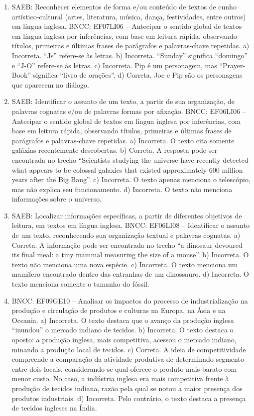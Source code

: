 \begin{enumerate}
\item
SAEB: Reconhecer elementos de forma e/ou conteúdo de textos de cunho
artístico-cultural (artes, literatura, música, dança, festividades,
entre outros) em língua inglesa. BNCC: EF07LI06 -- Antecipar o sentido
global de textos em língua inglesa por inferências, com base em leitura
rápida, observando títulos, primeiras e últimas frases de parágrafos e
palavras-chave repetidas.
a) Incorreta. ``Js'' refere-se às letras. b) Incorreta. ``Sunday''
significa ``domingo'' e ``J-O'' refere-se às letras. c) Incorreta. Pip é
um personagem, mas ``Prayer-Book'' significa ``livro de orações''. d)
Correta. Joe e Pip são os personagens que aparecem no diálogo.

\item
SAEB: Identificar o assunto de um texto, a partir de sua organização, de
palavras cognatas e/ou de palavras formas por afixação. BNCC: EF06LI06
-- Antecipar o sentido global de textos em língua inglesa por
inferências, com base em leitura rápida, observando títulos, primeiras e
últimas frases de parágrafos e palavras-chave repetidas.
a) Incorreta. O texto cita somente galáxias recentemente descobertas. b)
Correta. A resposta pode ser encontrada no trecho ``Scientists studying
the universe have recently detected what appears to be colossal galaxies
that existed approximately 600 million years after the Big Bang''. c)
Incorreta. O texto apenas menciona o telescópio, mas não explica seu
funcionamento. d) Incorreta. O texto não menciona informações sobre o
universo.

\item
SAEB: Localizar informações específicas, a partir de diferentes
objetivos de leitura, em textos em língua inglesa. BNCC: EF06LI08 --
Identificar o assunto de um texto, reconhecendo sua organização textual
e palavras cognatas.
a) Correta. A informação pode ser encontrada no trecho ``a dinosaur
devoured its final meal: a tiny mammal measuring the size of a mouse''.
b) Incorreta. O texto não menciona uma nova espécie. c) Incorreta. O
texto menciona um mamífero encontrado dentro das entranhas de um
dinossauro. d) Incorreta. O texto menciona somente o tamanho do fóssil.

\item
BNCC: EF09GE10 -- Analisar os impactos do processo de industrialização na
produção e circulação de produtos e culturas na Europa, na Ásia e na
Oceania.
a) Incorreta. O texto destaca que o avanço da produção inglesa
``inundou'' o mercado indiano de tecidos.
b) Incorreta. O texto destaca o oposto: a produção inglesa, mais
competitiva, acessou o mercado indiano, minando a produção local de
tecidos.
c) Correta. A ideia de competitividade compreende a
comparação da atividade produtiva de determinado segmento entre dois
locais, considerando-se qual oferece o produto mais barato com menor custo. No caso, a
indústria inglesa era mais competitiva frente à produção de tecidos
indiana, razão pela qual se notou a maior presença dos produtos
industriais.
d) Incorreta. Pelo contrário, o texto destaca a presença de tecidos
ingleses na Índia.


\end{enumerate}

